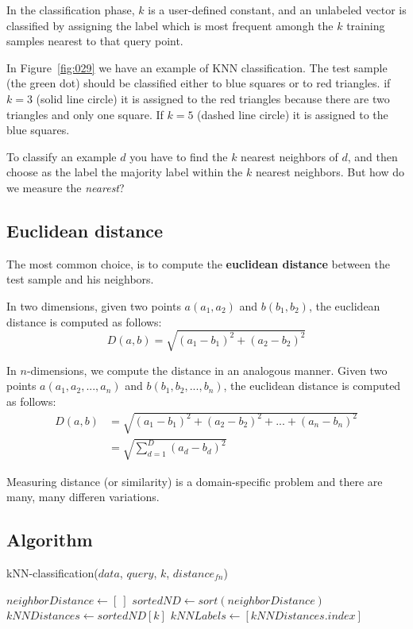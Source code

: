 In the classification phase, \(k\) is a user-defined constant, and an unlabeled vector is classified by assigning the label which is most frequent amongh the \(k\) training samples nearest to that query point.

In Figure~\ref{fig:029} we have an example of KNN classification. The test sample (the green dot) should be classified either to blue squares or to red triangles. if \(k=3\) (solid line circle) it is assigned to the red triangles because there are two triangles and only one square. If \(k=5\) (dashed line circle) it is assigned to the blue squares.

To classify an example \(d\) you have to find the \(k\) nearest neighbors of \(d\), and then choose as the label the majority label within the \(k\) nearest neighbors. But how do we measure the \emph{nearest}?

\subsection{Euclidean distance}
The most common choice, is to compute the \textbf{euclidean distance} between the test sample and  his neighbors.

In two dimensions, given two points \(a(a_1, a_2)\) and \(b(b_1, b_2)\), the euclidean distance is computed as follows:
\[D(a,b) = \sqrt{(a_1-b_1)^2 + (a_2-b_2)^2}\]

In \(n\)-dimensions, we compute the distance in an analogous manner. Given two points \(a(a_1, a_2, ..., a_n)\) and \(b(b_1, b_2, ..., b_n)\), the euclidean distance is computed as follows:
\begin{align}
D(a,b)  &= \sqrt{(a_1-b_1)^2 + (a_2-b_2)^2 + ... + (a_n-b_n)^2}\\
        &=\sqrt{\sum_{d=1}^D(a_d-b_d)^2}
\end{align}

Measuring distance (or similarity) is a domain-specific problem and there are many, many differen variations.

\subsection{Algorithm}
\begin{algorithm}
\caption{kNN-classification($data$, $query$, $k$, $distance_{fn}$)}
\label{alg:knn}
$neighborDistance \gets [\ ]$\;
$sortedND \gets sort(neighborDistance)$\;
$kNNDistances \gets sortedND[k]$
$kNNLabels \gets [kNNDistances.index]$
\end{algorithm}


